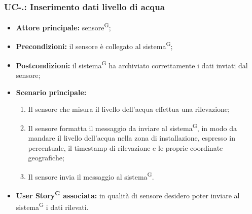 \documentclass[8pt]{article}
\newcommand{\glossterm}[1]{#1\textsuperscript{G}} %
\begin{document}
\subsubsection*{UC-\theuc .\speconenumber: Inserimento dati livello di acqua}
\begin{itemize}
    \item \textbf{Attore principale:} \glossterm{sensore};
    \item \textbf{Precondizioni:} il sensore è collegato al \glossterm{sistema};
    \item \textbf{Postcondizioni:} il \glossterm{sistema} ha archiviato correttamente i dati inviati dal sensore;
    \item \textbf{Scenario principale:}
        \begin{enumerate}
        \item Il sensore che misura il livello dell'acqua effettua una rilevazione;
        \item Il sensore formatta il messaggio da inviare al \glossterm{sistema}, in modo da mandare il livello dell'acqua nella zona di installazione, espresso in percentuale, il timestamp di rilevazione e le proprie coordinate geografiche;
        \item Il sensore invia il messaggio al \glossterm{sistema}.
        \end{enumerate}
    \item \textbf{\glossterm{User Story} associata:} in qualità di sensore desidero poter inviare al \glossterm{sistema} i dati rilevati.
\end{itemize}
\end{document}
